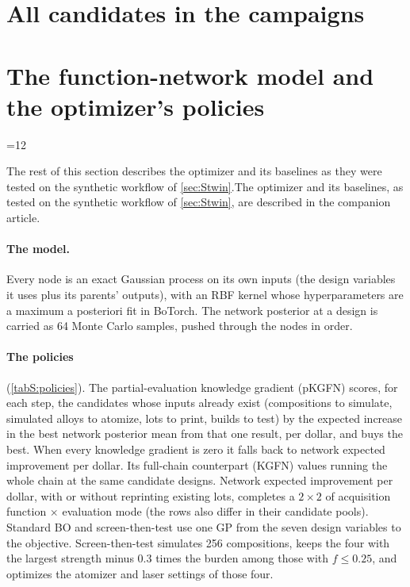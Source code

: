 \documentclass[11pt]{article}
\newcommand{\checksec}[1]{\ifnum\value{section}=#1\relax\else
  \PackageError{SI}{Section numbering drifted: this section must be S#1}{The
  manuscript and figure-plan.md cite SI sections by number.}\fi}
\begin{document}
\section{All candidates in the campaigns}
\label{sec:Scandidates}

\section{The function-network model and the optimizer's policies}
\label{sec:Smodel}\checksec{12}
 \ifbofnfull The rest of this
section describes the optimizer and its baselines as they were tested on the
synthetic workflow of \cref{sec:Stwin}.\else The optimizer and its baselines, as
tested on the synthetic workflow of \cref{sec:Stwin}, are described in the
companion article.\bofncite\fi
\ifbofnfull

\paragraph{The model.} Every node is an exact Gaussian process on its own inputs
(the design variables it uses plus its parents' outputs), with an RBF kernel
whose hyperparameters are a maximum a posteriori fit in
BoTorch.\cite{balandat2020} The network posterior at a design is carried as 64
Monte Carlo samples, pushed through the nodes in order.\cite{astudillo2021}

\paragraph{The policies} (\cref{tabS:policies}). The partial-evaluation
knowledge gradient (pKGFN) scores, for each step, the candidates whose inputs
already exist (compositions to simulate, simulated alloys to atomize, lots to
print, builds to test) by the expected increase in the best network posterior
mean from that one result, per dollar,\cite{buathong2024} and buys the best.
When every knowledge gradient is zero it falls back to network expected
improvement per dollar. Its full-chain counterpart (KGFN) values running the
whole chain at the same candidate designs. Network expected improvement per
dollar, with or without reprinting existing lots, completes a $2\times2$ of
acquisition function $\times$ evaluation mode (the rows also differ in their
candidate pools). Standard BO and screen-then-test use one GP from the seven
design variables to the objective. Screen-then-test simulates 256 compositions,
keeps the four with the largest strength minus 0.3 times the burden among those
with $f\le0.25$, and optimizes the atomizer and laser settings of those four.
\end{document}
